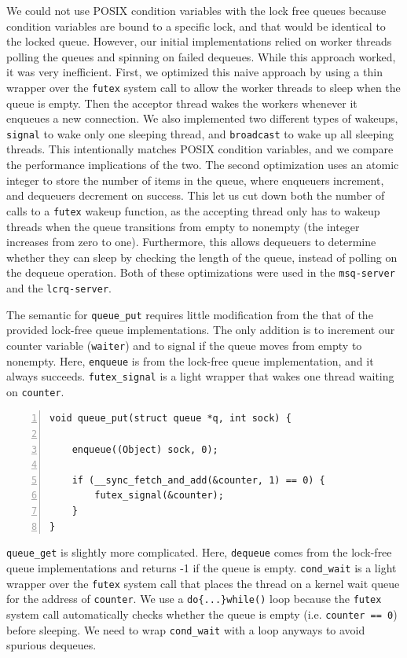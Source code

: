 \documentclass[twoside,10pt]{article}
\begin{document}
\begin{multicols}{2}
We could not use POSIX condition variables with the lock free queues
because condition variables are bound to a specific lock, and that
would be identical to the locked queue. However, our initial
implementations relied on worker threads polling the queues and
spinning on failed dequeues. While this approach worked, it was very
inefficient. First, we optimized this naive approach by using a thin
wrapper over the \verb+futex+ system call to allow the worker threads
to sleep when the queue is empty. Then the acceptor thread wakes the
workers whenever it enqueues a new connection.  We also implemented
two different types of wakeups, \verb+signal+ to wake only one
sleeping thread, and \verb+broadcast+ to wake up all sleeping threads.
This intentionally matches POSIX condition variables, and we compare
the performance implications of the two. The second optimization uses
an atomic integer to store the number of items in the queue, where
enqueuers increment, and dequeuers decrement on success. This let us
cut down both the number of calls to a \verb+futex+ wakeup function,
as the accepting thread only has to wakeup threads when the queue
transitions from empty to nonempty (the integer increases from zero to
one). Furthermore, this allows dequeuers to determine whether they can
sleep by checking the length of the queue, instead of polling on the
dequeue operation. Both of these optimizations were used in the
\verb+msq-server+ and the \verb+lcrq-server+.

The semantic for \verb+queue_put+ requires little modification from
the that of the provided lock-free queue implementations. The only
addition is to increment our counter variable (\verb+waiter+) and to
signal if the queue moves from empty to nonempty. Here, \verb+enqueue+
is from the lock-free queue implementation, and it always
succeeds. \verb+futex_signal+ is a light wrapper that wakes one thread
waiting on \verb+counter+.
\begin{Verbatim}[numbers=left,
                 fontsize=\small]
void queue_put(struct queue *q, int sock) {

    enqueue((Object) sock, 0); 	

    if (__sync_fetch_and_add(&counter, 1) == 0) { 
        futex_signal(&counter); 
    }
}
\end{Verbatim}

\verb+queue_get+ is slightly more complicated. Here, \verb+dequeue+
comes from the lock-free queue implementations and returns -1 if the
queue is empty. \verb+cond_wait+ is a light wrapper over the
\verb+futex+ system call that places the thread on a kernel wait queue
for the address of \verb+counter+. We use a \verb+do{...}while()+ loop
because the \verb+futex+ system call automatically checks whether the
queue is empty (i.e.  \verb+counter == 0+) before sleeping. We need to
wrap \verb+cond_wait+ with a loop anyways to avoid spurious dequeues.


\end{multicols}
\end{document}

